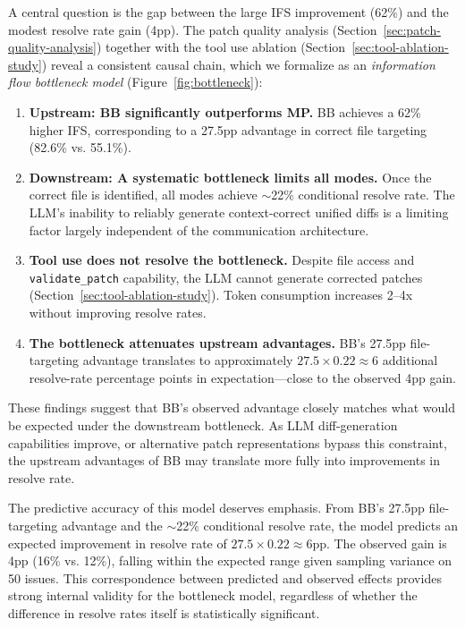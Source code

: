 \documentclass{ieeeaccess}
\begin{document}
A central question is the gap between the large IFS improvement (62\%) and the modest resolve rate gain (4pp). The patch quality analysis (Section~\ref{sec:patch-quality-analysis}) together with the tool use ablation (Section~\ref{sec:tool-ablation-study}) reveal a consistent causal chain, which we formalize as an \emph{information flow bottleneck model} (Figure~\ref{fig:bottleneck}):

\begin{enumerate}
\item \textbf{Upstream: BB significantly outperforms MP.} BB achieves a 62\% higher IFS, corresponding to a 27.5pp advantage in correct file targeting (82.6\% vs. 55.1\%).

\item \textbf{Downstream: A systematic bottleneck limits all modes.} Once the correct file is identified, all modes achieve $\sim$22\% conditional resolve rate. The LLM's inability to reliably generate context-correct unified diffs is a limiting factor largely independent of the communication architecture.

\item \textbf{Tool use does not resolve the bottleneck.} Despite file access and \texttt{validate\_patch} capability, the LLM cannot generate corrected patches (Section~\ref{sec:tool-ablation-study}). Token consumption increases 2--4x without improving resolve rates.

\item \textbf{The bottleneck attenuates upstream advantages.} BB's 27.5pp file-targeting advantage translates to approximately $27.5 \times 0.22 \approx 6$ additional resolve-rate percentage points in expectation---close to the observed 4pp gain.

\end{enumerate}
These findings suggest that BB's observed advantage closely matches what would be expected under the downstream bottleneck. As LLM diff-generation capabilities improve, or alternative patch representations bypass this constraint, the upstream advantages of BB may translate more fully into improvements in resolve rate.

The predictive accuracy of this model deserves emphasis. From BB's 27.5pp file-targeting advantage and the $\sim$22\% conditional resolve rate, the model predicts an expected improvement in resolve rate of $27.5 \times 0.22 \approx 6$pp. The observed gain is 4pp (16\% vs. 12\%), falling within the expected range given sampling variance on 50 issues. This correspondence between predicted and observed effects provides strong internal validity for the bottleneck model, regardless of whether the difference in resolve rates itself is statistically significant.
\end{document}
